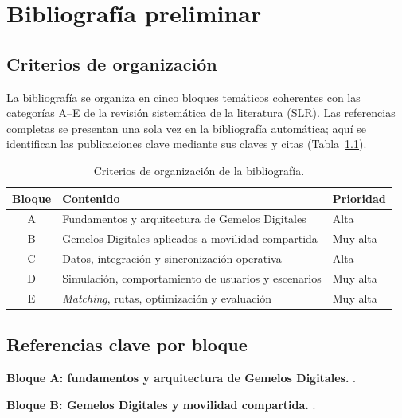 
\chapter{Bibliografía preliminar}
\label{ch:bibliografia-preliminar}

\section{Criterios de organización}

La bibliografía se organiza en cinco bloques temáticos coherentes con las categorías A--E de la revisión sistemática de la literatura (SLR). Las referencias completas se presentan una sola vez en la bibliografía automática; aquí se identifican las publicaciones clave mediante sus claves y citas (Tabla~\ref{tab:bloques-bibliografia}).

\begin{table}[H]
  \centering
  \begin{tabularx}{\textwidth}{c X l}
    \hline
    \textbf{Bloque} & \textbf{Contenido} & \textbf{Prioridad} \\
    \hline
    A & Fundamentos y arquitectura de Gemelos Digitales & Alta \\
    B & Gemelos Digitales aplicados a movilidad compartida & Muy alta \\
    C & Datos, integración y sincronización operativa & Alta \\
    D & Simulación, comportamiento de usuarios y escenarios & Muy alta \\
    E & \textit{Matching}, rutas, optimización y evaluación & Muy alta \\
    \hline
  \end{tabularx}
  \caption{Criterios de organización de la bibliografía.}
  \label{tab:bloques-bibliografia}
\end{table}

\section{Referencias clave por bloque}

\noindent\textbf{Bloque A: fundamentos y arquitectura de Gemelos Digitales.} \cite{A1,A2,A3,A5,A9}.

\noindent\textbf{Bloque B: Gemelos Digitales y movilidad compartida.} \cite{B1,B4,B5,B6}.

